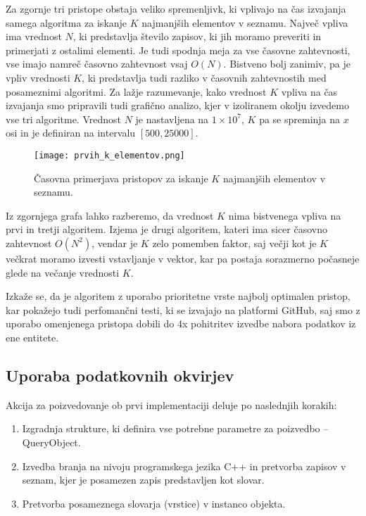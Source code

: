 \documentclass[a4paper,12pt,openright]{book}
\begin{document}
        \noindent
        Za zgornje tri pristope obstaja veliko spremenljivk, ki vplivajo na čas izvajanja samega algoritma za iskanje $K$ najmanjših elementov v seznamu. Največ vpliva ima vrednost $N$, ki predstavlja število zapisov, ki jih moramo preveriti in primerjati z ostalimi elementi. Je tudi spodnja meja za vse časovne zahtevnosti, vse imajo namreč časovno zahtevnost vsaj $O(N)$. Bistveno bolj zanimiv, pa je vpliv vrednosti $K$, ki predstavlja tudi razliko v časovnih zahtevnostih med posameznimi algoritmi. Za lažje razumevanje, kako vrednost $K$ vpliva na čas izvajanja smo pripravili tudi grafično analizo, kjer v izoliranem okolju izvedemo vse tri algoritme. Vrednost $N$ je nastavljena na $1 \times 10^7$, $K$ pa se spreminja na $x$ osi in je definiran na intervalu $[500, 25000]$.

        \begin{figure}[H]
            \centerline{\texttt{[image: prvih\_k\_elementov.png]}}
            \caption{Časovna primerjava pristopov za iskanje $K$ najmanjših elementov v seznamu.}
            \label{sl:k_smallest}
        \end{figure}

        \noindent
        Iz zgornjega grafa lahko razberemo, da vrednost $K$ nima bistvenega vpliva na prvi in tretji algoritem. Izjema je drugi algoritem, kateri ima sicer časovno zahtevnost $O(N^2)$, vendar je $K$ zelo pomemben faktor, saj večji kot je $K$ večkrat moramo izvesti vstavljanje v vektor, kar pa postaja sorazmerno počasneje glede na večanje vrednosti $K$.

        Izkaže se, da je algoritem z uporabo prioritetne vrste najbolj optimalen pristop, kar pokažejo tudi perfomančni testi, ki se izvajajo na platformi GitHub, saj smo z uporabo omenjenega pristopa dobili do 4x pohitritev izvedbe nabora podatkov iz ene entitete.

        \subsection{Uporaba podatkovnih okvirjev}

        Akcija za poizvedovanje ob prvi implementaciji deluje po naslednjih korakih:
        \begin{enumerate}
            \item Izgradnja strukture, ki definira vse potrebne parametre za poizvedbo – QueryObject.
            \item Izvedba branja na nivoju programskega jezika C++ in pretvorba zapisov v seznam, kjer je posamezen zapis predstavljen kot slovar.
            \item Pretvorba posameznega slovarja (vrstice) v instanco objekta.
        \end{enumerate}
\end{document}
